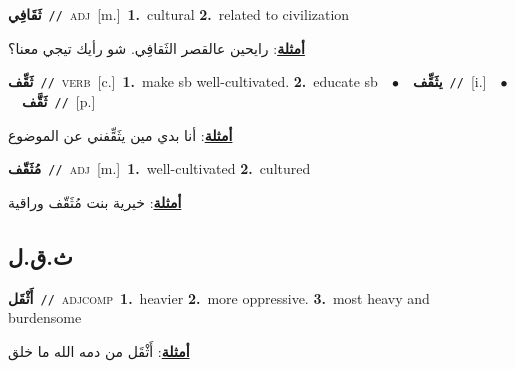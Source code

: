 \documentclass[10pt,a4paper,twoside]{article} %
\begin{document}
\begin{multicols}{2}
{{{{{{{{\setlength\topsep{0pt}\textbf{\foreignlanguage{arabic}{ثَقَافِي}}\ {\color{gray}\texttt{//}\color{black}}\ \textsc{adj}\ [m.]\ \textbf{1.}~cultural  \textbf{2.}~related to civilization\  \begin{flushright}\color{gray}\foreignlanguage{arabic}{\textbf{\underline{\foreignlanguage{arabic}{أمثلة}}}: رايحين عالقصر الثَقافِي. شو رأيك تيجي معنا؟}\end{flushright}\color{black}} \vspace{2mm}

{\setlength\topsep{0pt}\textbf{\foreignlanguage{arabic}{ثَقِّف}}\ {\color{gray}\texttt{//}\color{black}}\ \textsc{verb}\ [c.]\ \textbf{1.}~make sb well-cultivated.  \textbf{2.}~educate sb\ \ $\bullet$\ \ \setlength\topsep{0pt}\textbf{\foreignlanguage{arabic}{يثَقِّف}}\ {\color{gray}\texttt{//}\color{black}}\ [i.]\ \ $\bullet$\ \ \setlength\topsep{0pt}\textbf{\foreignlanguage{arabic}{ثَقَّف}}\ {\color{gray}\texttt{//}\color{black}}\ [p.]\  \begin{flushright}\color{gray}\foreignlanguage{arabic}{\textbf{\underline{\foreignlanguage{arabic}{أمثلة}}}: أنا بدي مين يثَقِّفني عن الموضوع}\end{flushright}\color{black}} \vspace{2mm}

{\setlength\topsep{0pt}\textbf{\foreignlanguage{arabic}{مُثَقّف}}\ {\color{gray}\texttt{//}\color{black}}\ \textsc{adj}\ [m.]\ \textbf{1.}~well-cultivated  \textbf{2.}~cultured\  \begin{flushright}\color{gray}\foreignlanguage{arabic}{\textbf{\underline{\foreignlanguage{arabic}{أمثلة}}}: خيرية بنت مُثَقّف وراقية}\end{flushright}\color{black}} \vspace{2mm}

\vspace{-3mm}
\subsection*{\color{blue}\foreignlanguage{arabic}{ث.ق.ل}\color{blue}{}} 

{\setlength\topsep{0pt}\textbf{\foreignlanguage{arabic}{أَثْقَل}}\ {\color{gray}\texttt{//}\color{black}}\ \textsc{adj\textunderscore comp}\ \textbf{1.}~heavier  \textbf{2.}~more oppressive.  \textbf{3.}~most heavy and burdensome\  \begin{flushright}\color{gray}\foreignlanguage{arabic}{\textbf{\underline{\foreignlanguage{arabic}{أمثلة}}}: أَثْقَل من دمه الله ما خلق}\end{flushright}\color{black}} \vspace{2mm}

}}}}}}}
\end{multicols}
\end{document}
